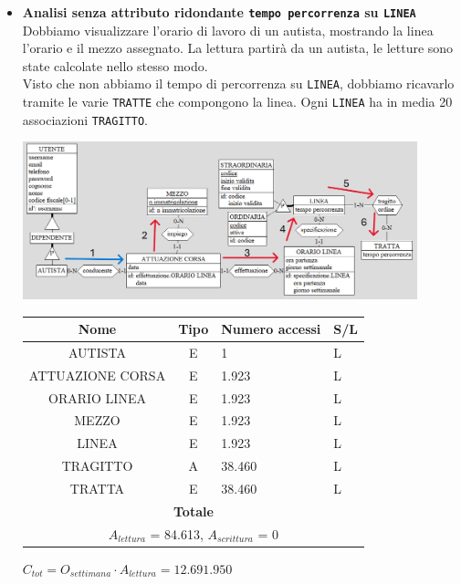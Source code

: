 \documentclass[12pt,a4paper]{report}
\begin{document}
\begin{enumerate}[label=\textbf{\arabic*}]
\begin{itemize}
            \item \textbf{Analisi senza attributo ridondante \texttt{tempo percorrenza} su \texttt{LINEA}} \\
            Dobbiamo visualizzare l'orario di lavoro di un autista, mostrando la linea l'orario e il mezzo assegnato.
            La lettura partirà da un autista, le letture sono state calcolate nello stesso modo.\\
            Visto che non abbiamo il tempo di percorrenza su \texttt{LINEA}, dobbiamo ricavarlo tramite le varie \texttt{TRATTE} che compongono la linea. Ogni \texttt{LINEA} ha in media 20 associazioni \texttt{TRAGITTO}.
            \begin{center}
	        \includegraphics[width=0.9\textwidth]{op_4_NORID}
	        \end{center}
            \begin{table}[H]
            \centering
            \begin{tabular}{|c|c|l|l|}
            \hline
            \textbf{Nome} & \textbf{Tipo} & \textbf{Numero accessi} & \textbf{S/L} \\
            \hline
            AUTISTA & E & 1 & L \\
            \hline
            ATTUAZIONE CORSA & E & 1.923 & L \\
            \hline
            ORARIO LINEA & E & 1.923 & L \\
            \hline
            MEZZO & E & 1.923 & L \\
            \hline
            LINEA & E & 1.923 & L \\
            \hline
            TRAGITTO & A & 38.460 & L \\
            \hline
            TRATTA & E & 38.460 & L \\
            \hline
            \multicolumn{4}{c}{\textbf{Totale}} \\
            \multicolumn{4}{c}{${A_{lettura}}$ = 84.613, ${A_{scrittura}}$ = 0} \\
            \hline
            \end{tabular}
            \end{table}
            \begin{center}
            ${C_{tot} = {O_{settimana}}\cdot {A_{lettura}} =12.691.950}$
            \end{center}
    \end{itemize}



\end{enumerate}
\end{document}
